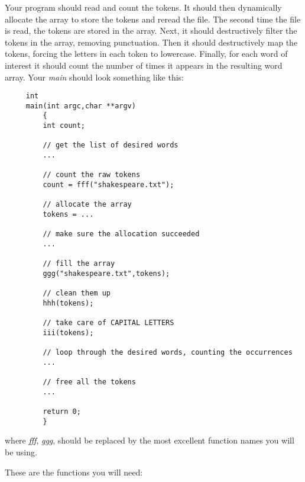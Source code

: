 \documentclass[12pt]{article}
\begin{document}
Your program should read and count the tokens. It should
then dynamically allocate the array to store the tokens and reread
the file. The second time the file is read,
the tokens are stored in the array. Next, it should
destructively filter the tokens in the array, removing punctuation.
Then it should destructively map the tokens, forcing the letters in each
token to lowercase.
Finally, for each word of interest
it should count the number of times it appears in the resulting word array.
Your {\it main} should look
something like this:

\begin{verbatim}
     int
     main(int argc,char **argv)
         {
         int count;

         // get the list of desired words
         ...

         // count the raw tokens
         count = fff("shakespeare.txt");

         // allocate the array
         tokens = ...

         // make sure the allocation succeeded
         ...

         // fill the array
         ggg("shakespeare.txt",tokens);
         
         // clean them up
         hhh(tokens);
         
         // take care of CAPITAL LETTERS
         iii(tokens);
         
         // loop through the desired words, counting the occurrences
         ...

         // free all the tokens
         ...

         return 0;
         }
\end{verbatim}

where {\it fff}, {\it ggg}, should be replaced by the most excellent function
names you will be using.

These are the functions you will need:
\end{document}
